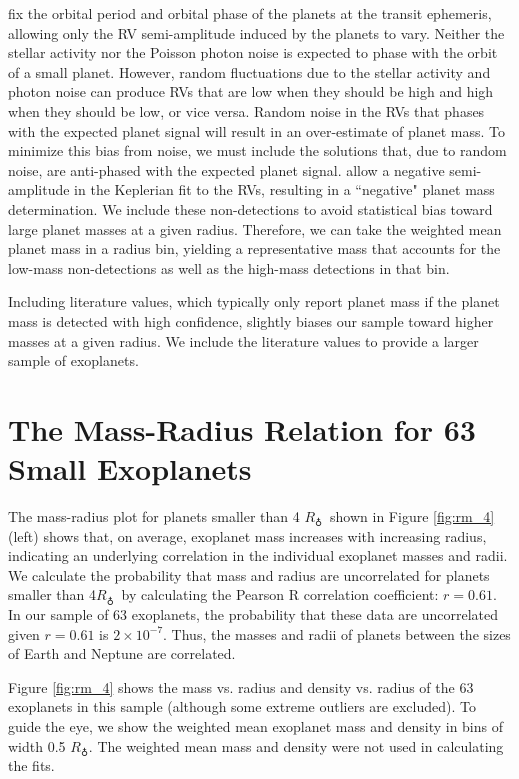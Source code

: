\documentclass[iop]{emulateapj}
\newcommand{\rearth}{\ensuremath{R_\earth}}
\begin{document}
\citet{Marcy2013} fix the orbital period and orbital phase of the planets at the transit ephemeris, allowing only the RV semi-amplitude induced by the planets to vary.  Neither the stellar activity nor the Poisson photon noise is expected to phase with the orbit of a small planet.  However, random fluctuations due to the stellar activity and photon noise can produce RVs that are low when they should be high and high when they should be low, or vice versa.  Random noise in the RVs that phases with the expected planet signal will result in an over-estimate of planet mass.  To minimize this bias from noise, we must include the solutions that, due to random noise, are anti-phased with the expected planet signal.  \citet{Marcy2013} allow  a negative semi-amplitude in the Keplerian fit to the RVs, resulting in a ``negative" planet mass determination.  We include these non-detections to avoid statistical bias toward large planet masses at a given radius.  Therefore, we can take the weighted mean planet mass in a radius bin, yielding a representative mass that accounts for the low-mass non-detections as well as the high-mass detections in that bin.

Including literature values, which typically only report planet mass if the planet mass is detected with high confidence, slightly biases our sample toward higher masses at a given radius.  We include the literature values to provide a larger sample of exoplanets.


\section{The Mass-Radius Relation for 63 Small Exoplanets}
The mass-radius plot for planets smaller than 4 \rearth\ shown in Figure \ref{fig:rm_4} (left) shows that, on average, exoplanet mass increases with increasing radius, indicating an underlying correlation in the individual exoplanet masses and radii.  We calculate the probability that mass and radius are uncorrelated for planets smaller than 4\rearth\ by calculating the Pearson R correlation coefficient: $r=0.61$.  In our sample of 63 exoplanets, the probability that these data are uncorrelated given $r = 0.61$ is $2 \times 10^{-7}$.  Thus, the masses and radii of planets between the sizes of Earth and Neptune are correlated.

Figure \ref{fig:rm_4} shows the mass vs. radius and density vs. radius of the 63 exoplanets in this sample (although some extreme outliers are excluded).  To guide the eye, we show the weighted mean exoplanet mass and density in bins of width 0.5 \rearth.  The weighted mean mass and density were not used in calculating the fits.
\end{document}
